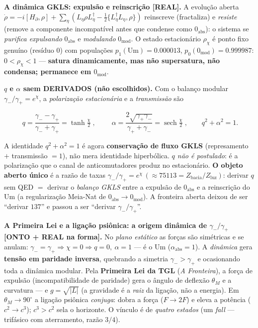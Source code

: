 \documentclass[11pt]{article}
\theoremstyle{definition}\newtheorem{deriv}{Derivação}
\begin{document}
\textbf{A dinâmica GKLS: expulsão e reinscrição \textsf{[REAL]}.} A evolução aberta $\dot\rho=-i[H_\partial,\rho]+\sum_\eta(L_\eta\rho L_\eta^\dagger-\tfrac12\{L_\eta^\dagger L_\eta,\rho\})$ reinscreve (fractaliza) e \emph{resiste} (remove a componente incompatível antes que condense como $0_{\mathrm{abs}}$): o sistema se \emph{purifica expulsando} $0_{\mathrm{abs}}$ e \emph{modulando} $0_{\mathrm{mod}}$. O estado estacionário $\rho_\chi$ é ponto fixo genuíno (resíduo $0$) com populações $p_1(\mathrm{Um})=0.000013$, $p_0(0_{\mathrm{mod}})=0.999987$: $0<\rho_\chi<1$ --- \textbf{satura dinamicamente, mas não supersatura, não condensa; permanece em $0_{\mathrm{mod}}$}.

\textbf{$q$ e $\alpha$ saem DERIVADOS (não escolhidos).} Com o balanço modular $\gamma_-/\gamma_+=e^\chi$, a \emph{polarização estacionária} e a \emph{transmissão} são

\begin{equation}\boxed{\;q=\frac{\gamma_--\gamma_+}{\gamma_-+\gamma_+}=\tanh\tfrac\chi2\;},\qquad \boxed{\;\alpha=\frac{2\sqrt{\gamma_+\gamma_-}}{\gamma_++\gamma_-}=\operatorname{sech}\tfrac\chi2\;},\qquad q^2+\alpha^2=1.\end{equation}

A identidade $q^2+\alpha^2=1$ é agora \textbf{conservação de fluxo GKLS} (represamento $+$ transmissão $=1$), não mera identidade hiperbólica. \emph{$q$ não é postulado}: é a polarização que o canal de anticomutadores produz no estacionário. \textbf{O objeto aberto único} é a razão de taxas $\gamma_-/\gamma_+=e^\chi\,(\approx75113=Z_{\mathrm{bacia}}/Z_{\mathrm{luz}})$: derivar $q$ sem QED $=$ derivar o \emph{balanço GKLS} entre a expulsão de $0_{\mathrm{abs}}$ e a reinscrição do Um (a regularização Meia-Nat de $0_{\mathrm{abs}}\to0_{\mathrm{mod}}$). A fronteira aberta deixou de ser ``derivar $137$'' e passou a ser ``derivar $\gamma_-/\gamma_+$''.

\textbf{A Primeira Lei e a ligação psiônica: a origem dinâmica de $\gamma_-/\gamma_+$ \textsf{[ONTO + REAL na forma]}.} No \emph{plano estático} as forças são simétricas e se anulam: $\gamma_-=\gamma_+\Rightarrow\chi=0\Rightarrow q=0,\ \alpha=1$ --- é o Um ($\alpha_{\mathrm{abs}}=1$). A \emph{dinâmica} gera \textbf{tensão em paridade inversa}, quebrando a simetria $\gamma_->\gamma_+$ e ocasionando toda a dinâmica modular. Pela \textbf{Primeira Lei da TGL} (\emph{A Fronteira}), a força de expulsão (incompatibilidade de paridade) gera o ângulo de deflexão $\theta_M$ e a curvatura --- e $g=\sqrt{|L|}$ (a gravidade é a \emph{raiz} da ligação, não a energia). Em $\theta_M\to90^\circ$ a ligação psiônica \emph{conjuga}: dobra a força ($F\to2F$) e eleva a potência ($c^2\to c^3$); $c^3>c^2$ sela o horizonte. O vínculo é de \emph{quatro estados} (um \emph{fall} --- trifásico com aterramento, razão $3/4$).
\end{document}
